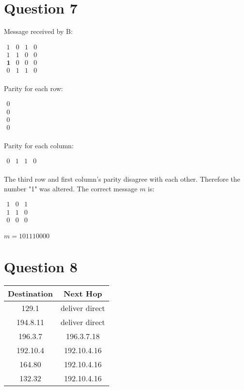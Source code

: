 \documentclass[12pt,letterpaper]{article}
\begin{document}
\section*{Question 7}
Message received by B:
\begin{center}
$\begin{matrix}
1 & 0 & 1 & 0 \\
1 & 1 & 0 & 0 \\
\textbf{1} & 0 & 0 & 0 \\
0 & 1 & 1 & 0 \\
\end{matrix}$
\end{center}
Parity for each row: 
\begin{center}
$\begin{matrix}
0 \\
0 \\
0 \\
0 \\
\end{matrix}$
\end{center}
Parity for each column:
\begin{center}
$\begin{matrix}
0 & 1 & 1 & 0 \\
\end{matrix}$
\end{center}
The third row and first column's parity disagree with each other. Therefore the number "1" was altered. The correct message $ m $ is: 
\begin{center}
$\begin{matrix}
1 & 0 & 1 \\
1 & 1 & 0 \\
0 & 0 & 0 \\
\end{matrix}$
\end{center}
$ m = 101110000$

\section*{Question 8}
\begin{center}
\begin{tabular}{ |c|c| } 
	\hline
	\textbf{Destination} & \textbf{Next Hop} \\
	\hline 
 	129.1 & deliver direct\\ 
 	\hline
 	194.8.11 & deliver direct\\ 
 	\hline
 	196.3.7 & 196.3.7.18\\ 
 	\hline
 	192.10.4 & 192.10.4.16\\ 
 	\hline
 	164.80 & 192.10.4.16\\ 
 	\hline
 	132.32 & 192.10.4.16\\ 
 	\hline
\end{tabular}
\end{center}
\newpage
\end{document}
